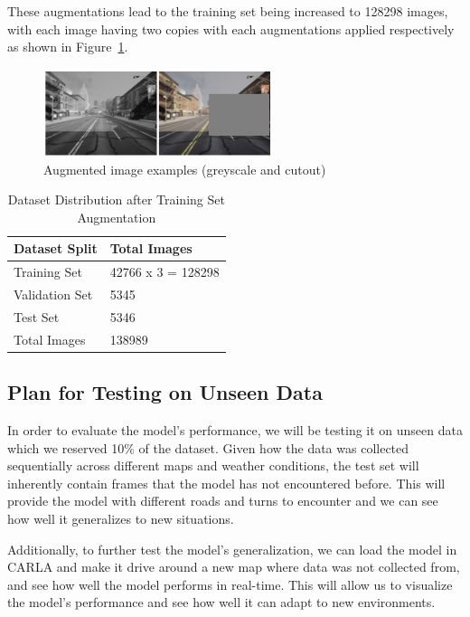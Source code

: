 \documentclass{article} %
\begin{document}
These augmentations lead to the training set being increased to 128298 images, with each image having two copies with each augmentations applied respectively as shown in Figure~\ref{fig:exampleofaugmented}.

\begin{figure}[H] %
    \centering
    \includegraphics[width=0.6\textwidth]{exampleofaugmented.png} %
    \caption{Augmented image examples (greyscale and cutout)}
    \label{fig:exampleofaugmented}
\end{figure}


\begin{table}[h]
\centering
\caption{Dataset Distribution after Training Set Augmentation}
\vspace{0.5em}
\begin{tabular}{|p{2cm}|p{2cm}|}
\hline
\textbf{Dataset Split} & \textbf{Total Images} \\ \hline
Training Set           & 42766 x 3 =  128298\\ \hline
Validation Set         & 5345 \\ \hline
Test Set               & 5346 \\ \hline
Total Images           & 138989 \\ \hline
\end{tabular}
\end{table}


\subsection{Plan for Testing on Unseen Data}

In order to evaluate the model's performance, we will be testing it on unseen data which we reserved 10\% of the dataset. Given how 
the data was collected sequentially across different maps and weather conditions, the test set will inherently contain frames that the model has not encountered before.
This will provide the model with different roads and turns to encounter and we can see how well it generalizes to new situations.

Additionally, to further test the model's generalization, we can load the model in CARLA and make it drive around a new map where data was not collected from, and see how well the model performs in 
real-time. This will allow us to visualize the model's performance and see how well it can adapt to new environments.
\end{document}
